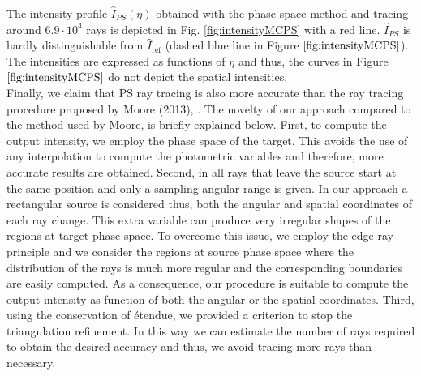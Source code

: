 \indent The intensity profile $\hat{I}_{PS}(\eta)$ obtained with the phase space method and tracing around $6.9\cdot 10^4$ rays is depicted in Fig. \ref{fig:intensityMCPS} with a red line.
$\hat{I}_{PS}$ is hardly distinguishable from $\hat{I}_{\mbox{ref}}$ (dashed blue line in Figure $\ref{fig:intensityMCPS}$). The intensities are expressed as functions of $\eta$ and thus, the curves in Figure $\ref{fig:intensityMCPS}$ do not depict the spatial intensities.\\
\indent Finally, we claim that PS ray tracing is also more accurate than the ray tracing procedure proposed by Moore (2013), \cite{moore2013methods}.
The novelty of our approach compared to the method used by Moore, is briefly explained below.
First, to compute the output intensity, we employ the phase space of the target. This avoids the use of any interpolation to compute the photometric variables and therefore, more accurate results are obtained.
Second, in \cite{moore2013methods} all rays that leave the source start at the same position and only a sampling angular range is given. In our approach a rectangular source is considered thus, both the angular and spatial coordinates of each ray change. This extra variable can produce very irregular shapes of the regions at target phase space. To overcome this issue, we employ the edge-ray principle and we consider the regions at source phase space where the distribution of the rays is much more regular and the corresponding boundaries are easily computed.
As a consequence, our procedure is suitable to compute the output intensity as function of both the angular or the spatial coordinates.
Third, using the conservation of \'{e}tendue, we provided a criterion to stop the triangulation refinement. In this way we can estimate the number of rays required to obtain the desired accuracy and thus, we avoid tracing more rays than necessary.

